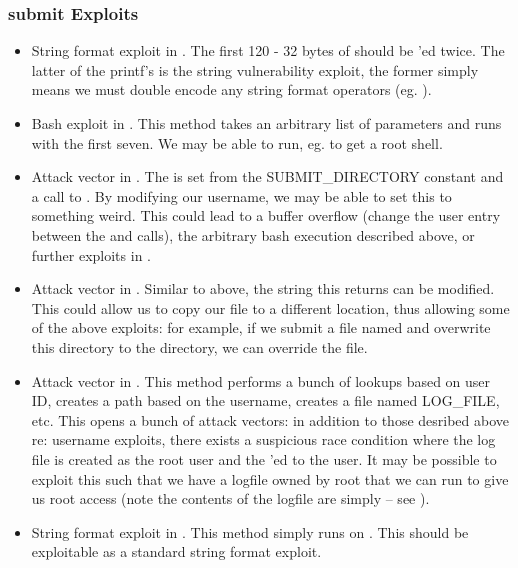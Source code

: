 \documentclass[12pt]{article}
\begin{document}
\subsubsection*{submit Exploits}
\begin{itemize}
\item String format exploit in . The first 120 - 32 bytes of  should be 'ed twice. The latter of the printf's is the string vulnerability exploit, the former simply means we must double encode any string format operators (eg. ).
\item Bash exploit in . This method takes an arbitrary list of parameters and runs  with the first seven. We may be able to run, eg.  to get a root shell.
\item Attack vector in . The  is set from the SUBMIT\_DIRECTORY constant and a call to . By modifying our username, we may be able to set this to something weird. This could lead to a buffer overflow (change the user entry between the  and  calls), the arbitrary bash execution described above, or further exploits in .
\item Attack vector in . Similar to above, the string this returns can be modified. This could allow us to copy our file to a different location, thus allowing some of the above exploits: for example, if we submit a file named  and overwrite this directory to the  directory, we can override the  file.
\item Attack vector in . This method performs a bunch of lookups based on user ID, creates a path based on the username, creates a file named LOG\_FILE, etc. This opens a bunch of attack vectors: in addition to those desribed above re: username exploits, there exists a suspicious race condition where the log file is created as the root user and the 'ed to the user. It may be possible to exploit this such that we have a logfile owned by root that we can run to give us root access (note the contents of the logfile are simply  -- see ).
\item String format exploit in . This method simply runs  on . This should be exploitable as a standard string format exploit.
\end{itemize}
\end{document}
